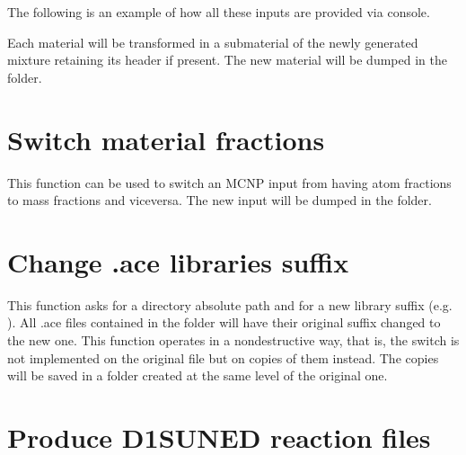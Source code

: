 \documentclass[letterpaper,10pt,english]{sphinxmanual}
\let\sphinxpxdimen\pdfpxdimen\else\newdimen\sphinxpxdimen
\begin{document}
\sphinxAtStartPar
The following is an example of how all these inputs are provided via console.

\begin{figure}[htbp]
\centering

\noindent\sphinxincludegraphics[width=600\sphinxpxdimen]{{generate}.png}
\end{figure}

\sphinxAtStartPar
Each material will be transformed in a submaterial of the newly generated mixture
retaining its header if present. The new material will be dumped in the
 folder.


\section{Switch material fractions}
\label{\detokenize{usage/utilities:switch-material-fractions}}
\sphinxAtStartPar
{}

\sphinxAtStartPar
This function can be used to switch an MCNP input from having atom fractions
to mass fractions and viceversa. The new input will be dumped in the
 folder.


\section{Change .ace libraries suffix}
\label{\detokenize{usage/utilities:change-ace-libraries-suffix}}
\sphinxAtStartPar
{}

\sphinxAtStartPar
This function asks for a directory absolute path and for a new library suffix
(e.g. ). All .ace files contained in the folder will have their original
suffix changed to the new one. This function operates in a non\sphinxhyphen{}destructive way,
that is, the switch is not implemented on the original file but on copies of
them instead. The copies will be saved in a folder created at the same level of
the original one. 


\section{Produce D1S\sphinxhyphen{}UNED reaction files}
\label{\detokenize{usage/utilities:produce-d1s-uned-reaction-files}}
\sphinxAtStartPar
{}
\end{document}
